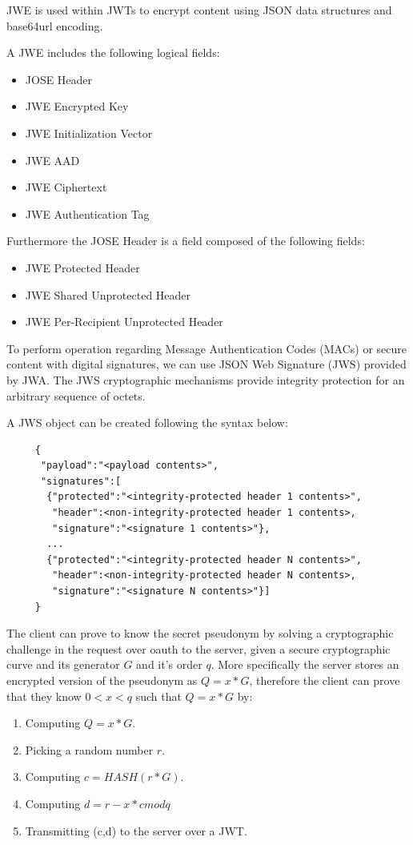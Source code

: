 JWE is used within JWTs to encrypt content using JSON data structures and base64url encoding.

A JWE includes the following logical fields:
\begin{itemize}
    \item JOSE Header
    \item JWE Encrypted Key
    \item JWE Initialization Vector
    \item JWE AAD
    \item JWE Ciphertext
    \item JWE Authentication Tag
\end{itemize}

Furthermore the JOSE Header is a field composed of the following fields:
\begin{itemize}
    \item JWE Protected Header
    \item JWE Shared Unprotected Header
    \item JWE Per-Recipient Unprotected Header
\end{itemize}

To perform operation regarding Message Authentication Codes (MACs) or secure content with digital signatures, we can use JSON Web Signature (JWS) provided by JWA. The JWS cryptographic mechanisms provide integrity protection for an arbitrary sequence of octets.  

A JWS object can be created following the syntax below:

\begin{lstlisting}
     {
      "payload":"<payload contents>",
      "signatures":[
       {"protected":"<integrity-protected header 1 contents>",
        "header":<non-integrity-protected header 1 contents>,
        "signature":"<signature 1 contents>"},
       ...
       {"protected":"<integrity-protected header N contents>",
        "header":<non-integrity-protected header N contents>,
        "signature":"<signature N contents>"}]
     }

\end{lstlisting}

The client can prove to know the secret pseudonym by solving a cryptographic challenge in the request over oauth to the server, given a secure cryptographic curve and its generator $G$ and it's order $q$. More specifically the server stores an encrypted version of the pseudonym as $Q = x * G$, therefore the client can prove that they know $0 < x < q$ such that $Q = x * G$ by:
\begin{enumerate}
    \item Computing $Q = x * G$.
    \item Picking a random number $r$.
    \item Computing $c = HASH(r * G)$.
    \item Computing $d = r - x*c mod q$
    \item Transmitting (c,d) to the server over a JWT.
\end{enumerate}

